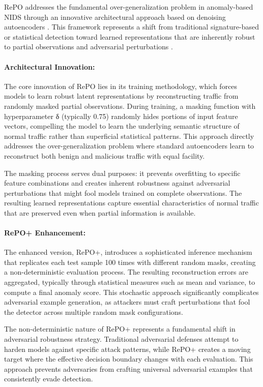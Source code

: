 RePO addresses the fundamental over-generalization problem in anomaly-based NIDS through an innovative architectural approach based on denoising autoencoders \cite{hashemi2020enhancing}. This framework represents a shift from traditional signature-based or statistical detection toward learned representations that are inherently robust to partial observations and adversarial perturbations \cite{hashemi2020enhancing}.

\paragraph{Architectural Innovation:}
The core innovation of RePO lies in its training methodology, which forces models to learn robust latent representations by reconstructing traffic from randomly masked partial observations. During training, a masking function with hyperparameter δ (typically 0.75) randomly hides portions of input feature vectors, compelling the model to learn the underlying semantic structure of normal traffic rather than superficial statistical patterns. This approach directly addresses the over-generalization problem where standard autoencoders learn to reconstruct both benign and malicious traffic with equal facility.

The masking process serves dual purposes: it prevents overfitting to specific feature combinations and creates inherent robustness against adversarial perturbations that might fool models trained on complete observations. The resulting learned representations capture essential characteristics of normal traffic that are preserved even when partial information is available.

\paragraph{RePO+ Enhancement:}
The enhanced version, RePO+, introduces a sophisticated inference mechanism that replicates each test sample 100 times with different random masks, creating a non-deterministic evaluation process. The resulting reconstruction errors are aggregated, typically through statistical measures such as mean and variance, to compute a final anomaly score. This stochastic approach significantly complicates adversarial example generation, as attackers must craft perturbations that fool the detector across multiple random mask configurations.

The non-deterministic nature of RePO+ represents a fundamental shift in adversarial robustness strategy. Traditional adversarial defenses attempt to harden models against specific attack patterns, while RePO+ creates a moving target where the effective decision boundary changes with each evaluation. This approach prevents adversaries from crafting universal adversarial examples that consistently evade detection.


